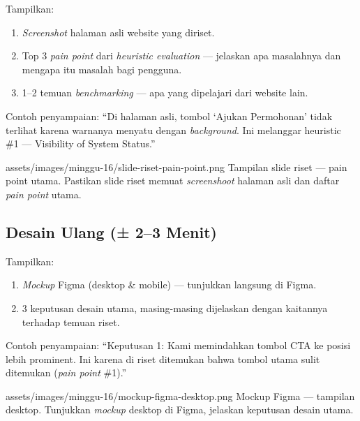 Tampilkan:
\begin{enumerate}
  \item \emph{Screenshot} halaman asli website yang diriset.
  \item Top 3 \emph{pain point} dari \emph{heuristic evaluation} --- jelaskan apa masalahnya dan mengapa itu masalah bagi pengguna.
  \item 1--2 temuan \emph{benchmarking} --- apa yang dipelajari dari website lain.
\end{enumerate}

\begin{catatan}
Contoh penyampaian: ``Di halaman asli, tombol `Ajukan Permohonan' tidak terlihat karena warnanya menyatu dengan \emph{background}. Ini melanggar heuristic \#1 --- Visibility of System Status.''
\end{catatan}

\begin{tangkapanlayar}
  {assets/images/minggu-16/slide-riset-pain-point.png}
  {Tampilan slide riset --- pain point utama.}
  {Pastikan slide riset memuat \emph{screenshoot} halaman asli dan daftar \emph{pain point} utama.}
\end{tangkapanlayar}

\subsection{Desain Ulang (± 2--3 Menit)}
\label{subsec:presentasi-desain}

Tampilkan:
\begin{enumerate}
  \item \emph{Mockup} Figma (desktop \& mobile) --- tunjukkan langsung di Figma.
  \item 3 keputusan desain utama, masing-masing dijelaskan dengan kaitannya terhadap temuan riset.
\end{enumerate}

\begin{tip}
Contoh penyampaian: ``Keputusan 1: Kami memindahkan tombol CTA ke posisi lebih prominent. Ini karena di riset ditemukan bahwa tombol utama sulit ditemukan (\emph{pain point} \#1).''
\end{tip}

\begin{tangkapanlayar}
  {assets/images/minggu-16/mockup-figma-desktop.png}
  {Mockup Figma --- tampilan desktop.}
  {Tunjukkan \emph{mockup} desktop di Figma, jelaskan keputusan desain utama.}
\end{tangkapanlayar}

